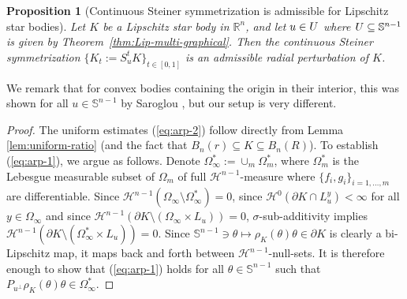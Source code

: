 \documentclass[11pt]{article}
\newtheorem{prop}[thm]{Proposition}
\theoremstyle{definition}
\theoremstyle{proof}
\DeclareMathOperator{\+}{\mathop{\tilde{+}}}
\newcommand{\R}{\mathbb{R}}
\renewcommand{\S}{\mathbb{S}}
\renewcommand{\H}{\mathcal{H}}
\numberwithin{equation}{section}
\numberwithin{equation}{section}
\begin{document}
\begin{prop}[Continuous Steiner symmetrization is admissible for Lipschitz star bodies] \label{prop:admissible}
Let $K$ be a Lipschitz star body in $\R^n$, and let $u \in U$ where $\U \subseteq \S^{n-1}$ is given by Theorem~\ref{thm:Lip-multi-graphical}. Then the continuous Steiner symmetrization $\{K_t := S_u^t K\}_{t \in [0,1]}$ is an admissible radial perturbation of $K$. 
\end{prop}
We remark that for convex bodies containing the origin in their interior, this was shown for all $u \in \S^{n-1}$ by Saroglou \cite[Section 4]{Saroglou-GeneralizedBCD}, but our setup is very different. 
\begin{proof}
The uniform estimates (\ref{eq:arp-2}) follow directly from Lemma \ref{lem:uniform-ratio} (and the fact that $B_n(r) \subseteq K \subseteq B_n(R)$). 
To establish (\ref{eq:arp-1}), we argue as follows. Denote $\Omega^*_\infty := \cup_m \Omega^*_m$, where $\Omega^*_m$ is the Lebesgue measurable subset of  $\Omega_m$ of full $\H^{n-1}$-measure where $\{f_i,g_i\}_{i=1,\ldots,m}$ are differentiable. Since $\H^{n-1}(\Omega_\infty \setminus \Omega^*_\infty) = 0$, since $\H^0(\partial K \cap L_u^y) < \infty$ for all $y \in \Omega_\infty$ and since $\H^{n-1}(\partial K \setminus (\Omega_\infty \times L_u)) = 0$, $\sigma$-sub-additivity implies $\H^{n-1}(\partial K \setminus (\Omega^*_\infty \times L_u)) = 0$. 
Since $\S^{n-1} \ni \theta \mapsto \rho_K(\theta) \theta \in \partial K$ is clearly a bi-Lipschitz map, it maps back and forth between $\H^{n-1}$-null-sets. 
It is therefore enough to show that (\ref{eq:arp-1}) holds for all $\theta \in \S^{n-1}$ such that $P_{u^{\perp}} \rho_K(\theta) \theta \in \Omega^*_\infty$. 


\end{proof}
\end{document}
